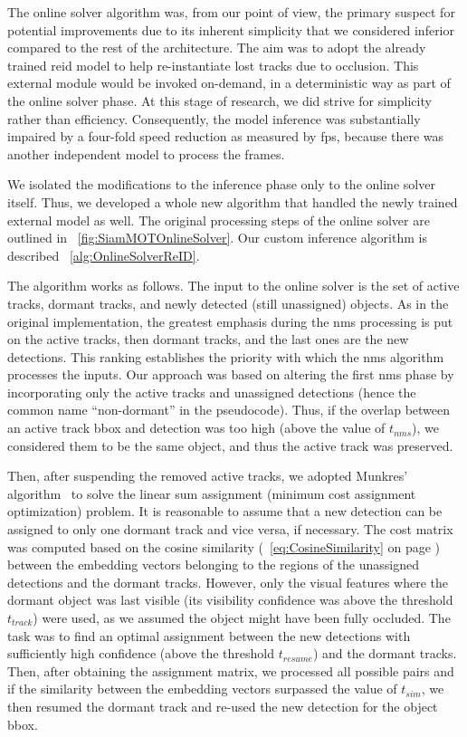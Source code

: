 The online solver algorithm was, from our point of view, the primary suspect for potential improvements due to its inherent simplicity that we considered inferior compared to the rest of the architecture. The aim was to adopt the already trained \gls{reid} model to help re-instantiate lost tracks due to occlusion. This external module would be invoked on-demand, in a deterministic way as part of the online solver phase. At this stage of research, we did strive for simplicity rather than efficiency. Consequently, the model inference was substantially impaired by a four-fold speed reduction as measured by \gls{fps}, because there was another independent model to process the frames.

We isolated the modifications to the inference phase only to the online solver itself. Thus, we developed a whole new algorithm that handled the newly trained external model as well. The original processing steps of the online solver are outlined in \figtext{}~\ref{fig:SiamMOTOnlineSolver}. Our custom inference algorithm is described \algtext{}~\ref{alg:OnlineSolverReID}.

The algorithm works as follows. The input to the online solver is the set of active tracks, dormant tracks, and newly detected (still unassigned) objects. As in the original implementation, the greatest emphasis during the \gls{nms} processing is put on the active tracks, then dormant tracks, and the last ones are the new detections. This ranking establishes the priority with which the \gls{nms} algorithm processes the inputs. Our approach was based on altering the first \gls{nms} phase by incorporating only the active tracks and unassigned detections (hence the common name ``non-dormant'' in the pseudocode). Thus, if the overlap between an active track \gls{bbox} and detection was too high (above the value of $t_{nms}$), we considered them to be the same object, and thus the active track was preserved.

Then, after suspending the removed active tracks, we adopted Munkres' algorithm~\cite{munkres1957assignment} to solve the linear sum assignment (minimum cost assignment optimization) problem. It is reasonable to assume that a new detection can be assigned to only one dormant track and vice versa, if necessary. The cost matrix was computed based on the cosine similarity (\eqtext{}~\ref{eq:CosineSimilarity} on page \pageref{eq:CosineSimilarity}) between the embedding vectors belonging to the regions of the unassigned detections and the dormant tracks. However, only the visual features where the dormant object was last visible (its visibility confidence was above the threshold $t_{track}$) were used, as we assumed the object might have been fully occluded. The task was to find an optimal assignment between the new detections with sufficiently high confidence (above the threshold $t_{resume}$) and the dormant tracks. Then, after obtaining the assignment matrix, we processed all possible pairs and if the similarity between the embedding vectors surpassed the value of $t_{sim}$, we then resumed the dormant track and re-used the new detection for the object \gls{bbox}.

